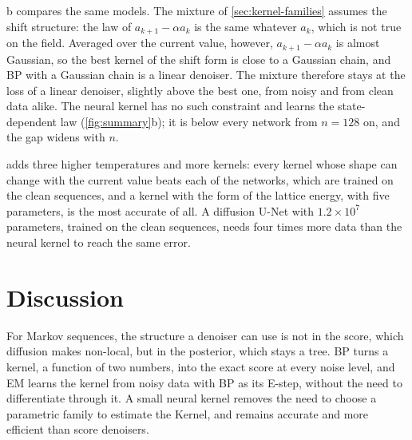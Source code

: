 \documentclass{article}
\begin{document}
b compares the same models. The mixture of \cref{sec:kernel-families} assumes the shift structure:
the law of $a_{k+1}-\alpha a_k$ is the same whatever $a_k$, which is not true on the field. Averaged over the current
value, however, $a_{k+1}-\alpha a_k$ is almost Gaussian, so the best kernel of the shift form is close to a Gaussian
chain, and BP with a Gaussian chain is a linear denoiser. The mixture therefore stays at the loss of a linear denoiser,
slightly above the best one, from noisy and from clean data alike. The neural kernel has no such constraint and learns
the state-dependent law (\cref{fig:summary}b); it is below every network from $n=128$ on, and the gap widens with $n$.

 adds three higher temperatures and more kernels: every kernel whose shape can change with the current
value beats each of the networks, which are trained on the clean sequences, and a kernel with the form of the lattice energy, with five
parameters, is the most accurate of all. A diffusion U-Net with $1.2\times10^{7}$ parameters, trained on the clean
sequences, needs four times more data than the neural kernel to reach the same error.
\section{Discussion}
\label{sec:discussion}

For Markov sequences, the structure a denoiser can use is not in the score, which diffusion makes non-local, but in the
posterior, which stays a tree. BP turns a kernel, a function of two numbers, into the exact score at every noise level,
and EM learns the kernel from noisy data with BP as its E-step, without the need to differentiate through it. A small neural
kernel removes the need to choose a parametric family to estimate the Kernel, and remains accurate and more efficient than score denoisers.
\end{document}
